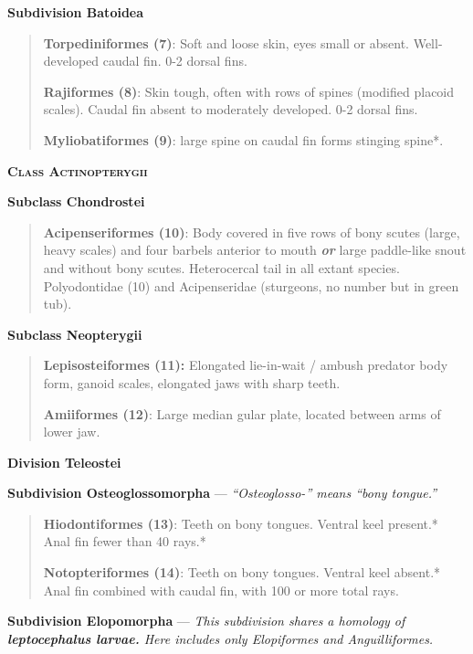 \documentclass[12pt, hidelinks]{exam}
\begin{document}
\textbf{Subdivision Batoidea}

\begin{quote}
\textbf{Torpediniformes (7)}: Soft and loose skin, eyes small or absent.
Well-developed caudal fin. 0-2 dorsal fins.

\textbf{Rajiformes (8)}: Skin tough, often with rows of spines (modified
placoid scales). Caudal fin absent to moderately developed. 0-2 dorsal
fins.

\textbf{Myliobatiformes (9)}: large spine on caudal fin forms stinging
spine*.
\end{quote}

\textbf{\textsc{Class Actinopterygii}}

\textbf{Subclass Chondrostei}

\begin{quote}
\textbf{Acipenseriformes (10)}: Body covered in five rows of bony scutes
(large, heavy scales) and four barbels anterior to mouth
\emph{\textbf{or}} large paddle-like snout and without bony scutes.
Heterocercal tail in all extant species. Polyodontidae (10) and
Acipenseridae (sturgeons, no number but in green tub).
\end{quote}

\textbf{Subclass Neopterygii}


\begin{quote}
\textbf{Lepisosteiformes (11):} Elongated lie-in-wait / ambush predator
body form, ganoid scales, elongated jaws with sharp teeth.

\textbf{Amiiformes (12)}: Large median gular plate, located between arms
of lower jaw.
\end{quote}

\textbf{Division Teleostei}

\textbf{Subdivision Osteoglossomorpha} — \textit{“Osteoglosso-” means “bony tongue.”}

\begin{quote}
\textbf{Hiodontiformes (13)}: Teeth on bony tongues. Ventral keel present.* Anal fin fewer than 40 rays.* 

\textbf{Notopteriformes (14)}: Teeth on bony tongues. Ventral keel absent.* Anal fin combined with caudal fin, with 100 or more total rays.

\end{quote}

\textbf{Subdivision Elopomorpha} — \textit{This subdivision shares a homology of \textbf{leptocephalus larvae.} Here includes only Elopiformes and Anguilliformes.}
\end{document}
